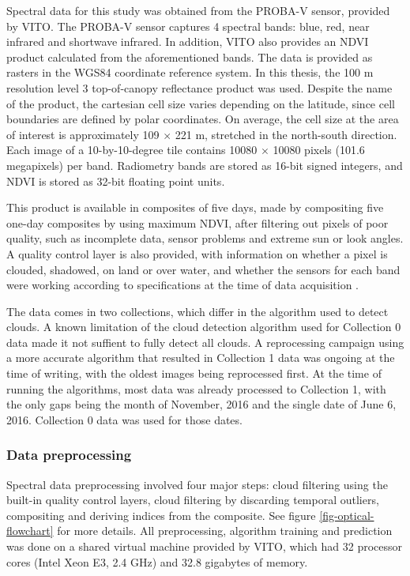 \documentclass[a4paper,10pt]{book}
\begin{document}
Spectral data for this study was obtained from the PROBA-V sensor, provided by VITO. The PROBA-V sensor captures 4 spectral bands: blue, red, near infrared and shortwave infrared. In addition, VITO also provides an NDVI product calculated from the aforementioned bands. The data is provided as rasters in the WGS84 coordinate reference system. In this thesis, the 100 m resolution level 3 top-of-canopy reflectance product was used. Despite the name of the product, the cartesian cell size varies depending on the latitude, since cell boundaries are defined by polar coordinates. On average, the cell size at the area of interest is approximately 109 $\times{}$ 221 m, stretched in the north-south direction. Each image of a 10-by-10-degree tile contains 10080 $\times{}$ 10080 pixels (101.6 megapixels) per band. Radiometry bands are stored as 16-bit signed integers, and NDVI is stored as 32-bit floating point units.

This product is available in composites of five days, made by compositing five one-day composites by using maximum NDVI, after filtering out pixels of poor quality, such as incomplete data, sensor problems and extreme sun or look angles. A quality control layer is also provided, with information on whether a pixel is clouded, shadowed, on land or over water, and whether the sensors for each band were working according to specifications at the time of data acquisition \citep{probavguide2}.

The data comes in two collections, which differ in the algorithm used to detect clouds. A known limitation of the cloud detection algorithm used for Collection 0 data made it not suffient to fully detect all clouds. A reprocessing campaign using a more accurate algorithm that resulted in Collection 1 data \citep{probavguide2} was ongoing at the time of writing, with the oldest images being reprocessed first. At the time of running the algorithms, most data was already processed to Collection 1, with the only gaps being the month of November, 2016 and the single date of June 6, 2016. Collection 0 data was used for those dates.

\subsubsection{Data preprocessing}
\label{sec-spectral-preprocessing}

Spectral data preprocessing involved four major steps: cloud filtering using the built-in quality control layers, cloud filtering by discarding temporal outliers, compositing and deriving indices from the composite. See figure \ref{fig-optical-flowchart} for more details. All preprocessing, algorithm training and prediction was done on a shared virtual machine provided by VITO, which had 32 processor cores (Intel Xeon E3, 2.4 GHz) and 32.8 gigabytes of memory.
\end{document}
